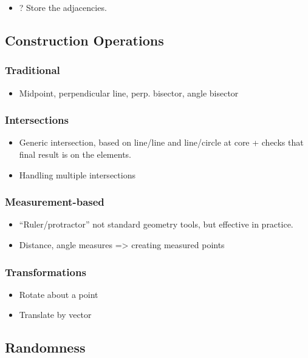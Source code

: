\documentclass[11pt]{article}
\begin{document}
\begin{itemize}
\item ? Store the adjacencies.
\end{itemize}
\subsection{Construction Operations}
\label{sec-3-3}
\subsubsection{Traditional}
\label{sec-3-3-1}

\begin{itemize}
\item Midpoint, perpendicular line, perp. bisector, angle bisector
\end{itemize}
\subsubsection{Intersections}
\label{sec-3-3-2}

\begin{itemize}
\item Generic intersection, based on line/line and line/circle at
      core + checks that final result is on the elements.
\item Handling multiple intersections
\end{itemize}
\subsubsection{Measurement-based}
\label{sec-3-3-3}

\begin{itemize}
\item ``Ruler/protractor'' not standard geometry tools, but effective
      in practice.
\item Distance, angle measures => creating measured points
\end{itemize}
\subsubsection{Transformations}
\label{sec-3-3-4}

\begin{itemize}
\item Rotate about a point
\item Translate by vector
\end{itemize}
\subsection{Randomness}
\label{sec-3-4}
\end{document}
